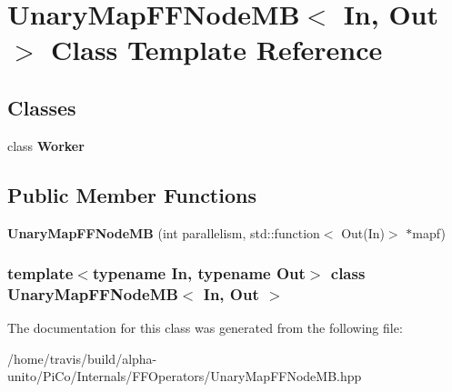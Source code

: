 \hypertarget{class_unary_map_f_f_node_m_b}{\section{\-Unary\-Map\-F\-F\-Node\-M\-B$<$ \-In, \-Out $>$ \-Class \-Template \-Reference}
\label{class_unary_map_f_f_node_m_b}
}
\subsection*{\-Classes}
\begin{DoxyCompactItemize}
\item 
class {\bfseries \-Worker}
\end{DoxyCompactItemize}
\subsection*{\-Public \-Member \-Functions}
\begin{DoxyCompactItemize}
\item 
\hypertarget{class_unary_map_f_f_node_m_b_a173555d5b9658a7867b9529621c3bc7a}{{\bfseries \-Unary\-Map\-F\-F\-Node\-M\-B} (int parallelism, std\-::function$<$ \-Out(\-In)$>$ $\ast$mapf)}\label{class_unary_map_f_f_node_m_b_a173555d5b9658a7867b9529621c3bc7a}

\end{DoxyCompactItemize}
\subsubsection*{template$<$typename \-In, typename \-Out$>$ class Unary\-Map\-F\-F\-Node\-M\-B$<$ In, Out $>$}



\-The documentation for this class was generated from the following file\-:\begin{DoxyCompactItemize}
\item 
/home/travis/build/alpha-\/unito/\-Pi\-Co/\-Internals/\-F\-F\-Operators/\-Unary\-Map\-F\-F\-Node\-M\-B.\-hpp\end{DoxyCompactItemize}
